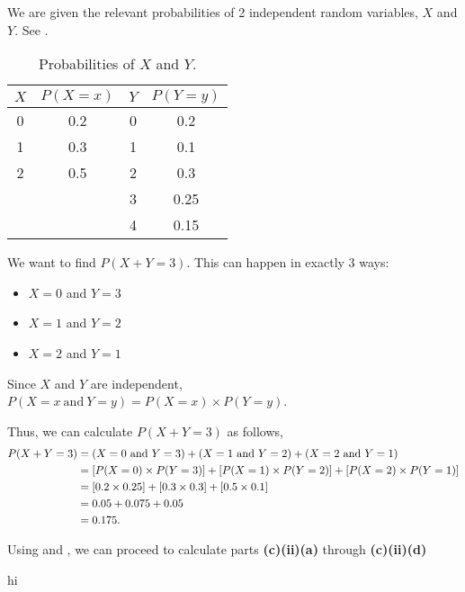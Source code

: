 \begin{subquestions}
\subquestion

We are given the relevant probabilities of 2 independent random variables, $X$ and $Y$. See .
\begin{table}[ht]
	\centering
	\begin{tabular}{|c|c|c|c|}
		\hline
		$X$ & $P(X=x)$ & $Y$ & $P(Y=y)$ \\
		\hline
		0 & 0.2 & 0 & 0.2 \\
		1 & 0.3 & 1 & 0.1 \\
		2 & 0.5 & 2 & 0.3 \\
		  &     & 3 & 0.25 \\
		  &     & 4 & 0.15 \\
		  \hline
	\end{tabular}
	\caption{\label{2014:q4:Tab1} Probabilities of $X$ and $Y$.}
\end{table}

\begin{subsubquestions} 

\subsubquestion

We want to find $P(X+Y=3)$. This can happen in exactly 3 ways:
\begin{itemize}
	\item $X = 0$ and $Y = 3$
	\item $X = 1$ and $Y = 2$
	\item $X = 2$ and $Y = 1$
\end{itemize}

Since $X$ and $Y$ are independent, $P(X=x ~\text{and}~ Y=y) = P(X=x) \times P(Y=y)$.

Thus, we can calculate $P(X+Y=3)$ as follows,
\begin{align}
	P(X+Y=3) & = (X=0 ~\text{and}~ Y=3) + (X=1 ~\text{and}~ Y=2) + (X=2 ~\text{and}~ Y=1) \nonumber \\
	         & = [P(X=0) \times P(Y=3)] + [P(X=1) \times P(Y=2)] + [P(X=2) \times P(Y=1)] \nonumber \\
	         & = [0.2 \times 0.25] + [0.3 \times 0.3] + [0.5 \times 0.1] \nonumber \\ 
	         & = 0.05 + 0.075+0.05 \nonumber \\
	         & = 0.175.
\end{align}


\subsubquestion

Using  and , we can proceed to calculate parts \textbf{(c)(ii)(a)} through \textbf{(c)(ii)(d)}
\begin{subsubsubquestions}
	
\subsubsubquestion

hi
	
	
	
\end{subsubsubquestions}
	
\end{subsubquestions}

\end{subquestions}

